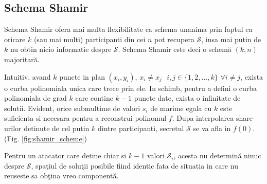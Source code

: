 \documentclass{llncs}
\begin{document}



\subsection{Schema Shamir}

Schema Shamir ofera mai multa flexibilitate ca schema unanima prin faptul ca oricare $k$ (sau mai multi) participanti
din cei $n$ pot recupera $\mathcal{S}$, insa mai putin de $k$ nu obtin nicio informatie despre $\mathcal{S}$. Schema Shamir este deci o schem\u{a} $(k,n)$ majoritar\u{a}.

Intuitiv, avand $k$ puncte in plan $(x_i, y_i)$, $x_i \neq x_j \text{ } i,j \in \{1,2,\dots,k\}$ $\forall i \neq j$, exista o curba polinomiala unica care trece prin ele.  
In schimb, pentru a defini o curba polinomiala de grad $k$ care contine $k - 1$ puncte date, exista o infinitate de solutii.
Evident, orice submultime de valori $s_i$ de marime egala cu $k$ este suficienta si necesara pentru a reconstrui polinomul $f$. Dupa interpolarea share-urilor detinute de cel putin $k$ dintre participanti, secretul $\mathcal{S}$ se va afla in $f(0)$. (Fig. \ref{fig:shamir_scheme}) 

Pentru un atacator care detine chiar si $k-1$ valori $\mathcal{S}_i$, acesta nu determin\u{a} nimic despre $\mathcal{S}$, spa\c{t}iul de solu\c{t}ii posibile fiind identic fata de situatia in care nu reuseste sa ob\c{t}ina vreo component\u{a}.
\end{document}
